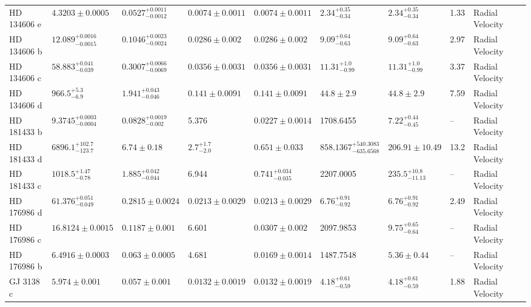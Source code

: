 \begin{tabular}{llllllllll}
HD 134606 e & $4.3203 \pm 0.0005$ & $0.0527^{+0.0011}_{-0.0012}$ & $0.0074 \pm 0.0011$ & $0.0074 \pm 0.0011$ & $2.34^{+0.35}_{-0.34}$ & $2.34^{+0.35}_{-0.34}$ & 1.33 & Radial Velocity & \cite{LI_ET_AL_2024} \\
HD 134606 b & $12.089^{+0.0016}_{-0.0015}$ & $0.1046^{+0.0023}_{-0.0024}$ & $0.0286 \pm 0.002$ & $0.0286 \pm 0.002$ & $9.09^{+0.64}_{-0.63}$ & $9.09^{+0.64}_{-0.63}$ & 2.97 & Radial Velocity & \cite{LI_ET_AL_2024} \\
HD 134606 c & $58.883^{+0.041}_{-0.039}$ & $0.3007^{+0.0066}_{-0.0069}$ & $0.0356 \pm 0.0031$ & $0.0356 \pm 0.0031$ & $11.31^{+1.0}_{-0.99}$ & $11.31^{+1.0}_{-0.99}$ & 3.37 & Radial Velocity & \cite{LI_ET_AL_2024} \\
HD 134606 d & $966.5^{+5.3}_{-6.9}$ & $1.941^{+0.043}_{-0.046}$ & $0.141 \pm 0.0091$ & $0.141 \pm 0.0091$ & $44.8 \pm 2.9$ & $44.8 \pm 2.9$ & 7.59 & Radial Velocity & \cite{LI_ET_AL_2024} \\
HD 181433 b & $9.3745^{+0.0003}_{-0.0004}$ & $0.0828^{+0.0019}_{-0.002}$ & 5.376 & $0.0227 \pm 0.0014$ & 1708.6455 & $7.22^{+0.44}_{-0.45}$ & -- & Radial Velocity & \cite{STANDING_ET_AL_2026} \\
HD 181433 d & $6896.1^{+102.7}_{-123.7}$ & $6.74 \pm 0.18$ & $2.7^{+1.7}_{-2.0}$ & $0.651 \pm 0.033$ & $858.1367^{+540.3083}_{-635.6568}$ & $206.91 \pm 10.49$ & 13.2 & Radial Velocity & \cite{STANDING_ET_AL_2026} \\
HD 181433 c & $1018.5^{+1.47}_{-0.78}$ & $1.885^{+0.042}_{-0.044}$ & 6.944 & $0.741^{+0.034}_{-0.035}$ & 2207.0005 & $235.5^{+10.8}_{-11.13}$ & -- & Radial Velocity & \cite{STANDING_ET_AL_2026} \\
HD 176986 d & $61.376^{+0.051}_{-0.049}$ & $0.2815 \pm 0.0024$ & $0.0213 \pm 0.0029$ & $0.0213 \pm 0.0029$ & $6.76^{+0.91}_{-0.92}$ & $6.76^{+0.91}_{-0.92}$ & 2.49 & Radial Velocity & \cite{NARI_ET_AL_2026} \\
HD 176986 c & $16.8124 \pm 0.0015$ & $0.1187 \pm 0.001$ & 6.601 & $0.0307 \pm 0.002$ & 2097.9853 & $9.75^{+0.65}_{-0.64}$ & -- & Radial Velocity & \cite{NARI_ET_AL_2026} \\
HD 176986 b & $6.4916 \pm 0.0003$ & $0.063 \pm 0.0005$ & 4.681 & $0.0169 \pm 0.0014$ & 1487.7548 & $5.36 \pm 0.44$ & -- & Radial Velocity & \cite{NARI_ET_AL_2026} \\
GJ 3138 c & $5.974 \pm 0.001$ & $0.057 \pm 0.001$ & $0.0132 \pm 0.0019$ & $0.0132 \pm 0.0019$ & $4.18^{+0.61}_{-0.59}$ & $4.18^{+0.61}_{-0.59}$ & 1.88 & Radial Velocity & \cite{ASTUDILLO_DEFRU_ET_AL__2017} \\

\end{tabular}
